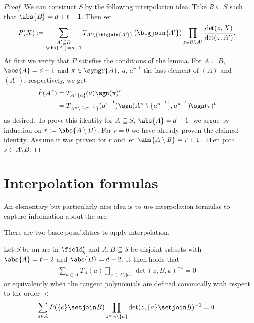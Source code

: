 \message{ !name(OnTheRAIDProblem.tex)}\documentclass[8pt,a4paper]{article}
\begin{document}
\begin{proof}
We can construct $S$ by the following interpolation idea. Take
$B\subseteq S$ such that $\abs{B}=d+t-1$. Then set
\begin{align}
\tilde{P}(X):=\sum_{\substack{A'\subseteq B\\
    \abs{A'}=d-1}}{T_{A'\setminus\{\bigjoin{A'}\}}\left(\bigjoin{A'}\right)\prod_{z\in
    B\setminus A'}{\frac{\det(z,X)}{\det(z,A')}}}\text{.}
\end{align}
At first we verify that $\tilde{P}$ satisfies the conditions of the
lemma. For $A\subseteq B$, $\abs{A}=d-1$ and $\pi\in\symgr{A}$, $a$, $a^{\pi^{-1}}$
the last element of $(A)$ and $(A^\pi)$, respectively, we get
\begin{align}
\tilde{P}(A^\pi)
 &= T_{A^\setminus\{a\}}(a)\sgn(\pi)^t\\
 &= T_{A^\pi\setminus\{a^{\pi^{-1}}\}}(a^{\pi^{-1}})\sgn(A^\pi\setminus\{a^{\pi^{-1}}\},a^{\pi^{-1}})\sgn(\pi)^t
\end{align}
as desired. To prove this identity for $A\subseteq S$, $\abs{A}=d-1$,
we argue by induction on $r:=\abs{A\setminus B}$. For $r=0$ we have
already proven the claimed identity. Assume it was proven for $r$ and
let $\abs{A\setminus B}=r+1$. Then pick $s\in A\setminus B$.
\end{proof}

\section{Interpolation formulas}

An elementary but particularly nice idea is to use interpolation
formulas to capture information about the arc.

There are two basic possibilities to apply interpolation. 

\begin{lemma}
Let $S$ be an arc in $\field_q^d$ and $A,B\subseteq S$ be disjoint subsets with
$\abs{A}=t+2$ and $\abs{B}=d-2$. It then holds that
\begin{align}
\sum_{a\in A}{T_{B}(a)\prod_{z\in A\setminus \{a\}}\det(z,B,a)^{-1}} =0
\end{align}
or equivalently when the tangent polynomials are defined canonically
with respect to the order $<$
\begin{align}
\sum_{a\in A}{P(\{a\}\setjoin B)\prod_{z\in A\setminus\{a\}}\det(z,\{a\}\setjoin B)^{-1}}=0\text{.}
\end{align}
\end{lemma}
\end{document}
